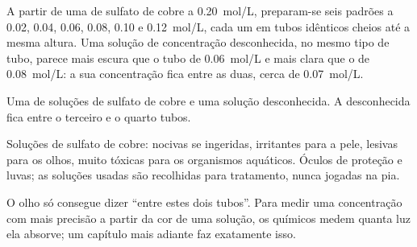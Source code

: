\begin{example}\label{ex:g10:concentration-and-dilution:scale}
A partir de uma  de sulfato de cobre a \qty{0.20}{mol/L},
preparam-se seis padrões a 0.02, 0.04, 0.06, 0.08, 0.10 e
\qty{0.12}{mol/L}, cada um em tubos idênticos cheios até a mesma altura.
Uma solução de concentração desconhecida, no mesmo tipo de tubo, parece
mais escura que o tubo de \qty{0.06}{mol/L} e mais clara que o de
\qty{0.08}{mol/L}: a sua concentração fica entre as duas, cerca de
\qty{0.07}{mol/L}.
\end{example}

\begin{omfigure}

{\small Uma  de soluções de sulfato de cobre e uma
solução desconhecida. A desconhecida fica entre o terceiro e o quarto
tubos.}
\end{omfigure}

\begin{safety}{}
Soluções de sulfato de cobre: nocivas se ingeridas, irritantes para a
pele, lesivas para os olhos, muito tóxicas para os organismos aquáticos.
Óculos de proteção e luvas; as soluções usadas são recolhidas para
tratamento, nunca jogadas na pia.
\end{safety}

\begin{remark}\label{rem:g10:concentration-and-dilution:eye}
O olho só consegue dizer ``entre estes dois tubos''. Para medir uma
concentração com mais precisão a partir da cor de uma solução, os
químicos medem quanta luz ela absorve; um capítulo mais adiante faz
exatamente isso.
\end{remark}

